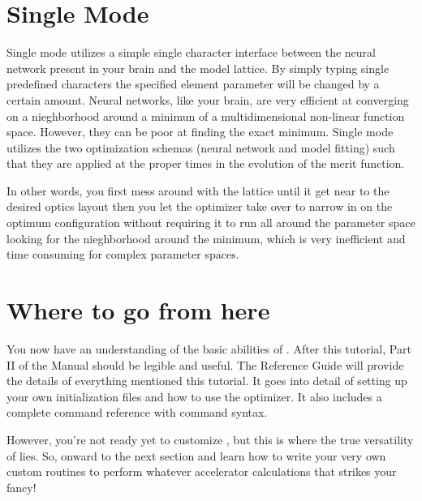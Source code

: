 
\section{Single Mode}
\label{s:single_mode}

Single mode utilizes a simple single character interface between the neural 
network present in your brain and the \tao model lattice. By simply typing
single predefined characters the specified element parameter will be changed by
a certain amount. Neural networks, like your brain, are very efficient at
converging on a nieghborhood around a minimun of a multidimensional non-linear
function space. However, they can be poor at finding the exact minimum. Single mode
utilizes the two optimization schemas (neural network and model fitting) such
that they are applied at the proper times in the evolution of the merit
function.

In other words, you first mess around with the lattice until it get near to the
desired optics layout then you let the optimizer take over to narrow in on the
optimum configuration without requiring it to run all around the
parameter space looking for the nieghborhood around the minimum, which is very
inefficient and time consuming for complex parameter spaces.


\section{Where to go from here}
\label{s:where_to_go}

You now have an understanding of the basic abilities of \tao. After this
tutorial, Part II of the \tao Manual should be legible and useful.
The Reference Guide will provide the details of everything mentioned this tutorial. 
It goes into detail of setting up your own initialization
files and how to use the optimizer. It also includes a complete command
reference with command syntax.

However, you're not ready yet to customize \tao, but this is where the true versatility
of \tao lies. So, onward to the next section and learn how to write your very
own custom routines to perform whatever accelerator calculations that strikes your
fancy!

